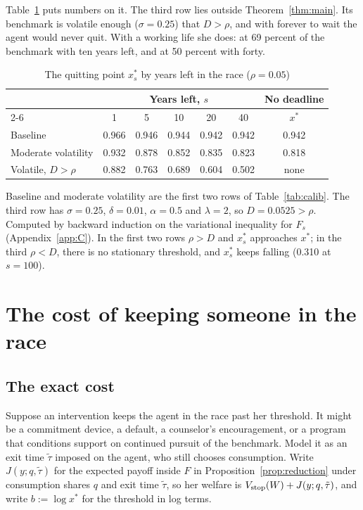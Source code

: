 \documentclass[12pt]{article}
\theoremstyle{definition}
\theoremstyle{remark}
\theoremstyle{plain}
\theoremstyle{definition}
\begin{document}
Table~\ref{tab:deadline} puts numbers on it. The third row lies outside Theorem~\ref{thm:main}. Its benchmark is volatile enough ($\sigma=0.25$) that $D>\rho$, and with forever to wait the agent would never quit. With a working life she does: at 69 percent of the benchmark with ten years left, and at 50 percent with forty.

\begin{table}[t]
\centering\small
\caption{The quitting point $x^*_s$ by years left in the race ($\rho=0.05$)}\label{tab:deadline}
\begin{tabular}{@{}lcccccc@{}}
\toprule
 & \multicolumn{5}{c}{Years left, $s$} & No deadline \\
\cmidrule(lr){2-6}
 & 1 & 5 & 10 & 20 & 40 & $x^*$ \\
\midrule
Baseline & 0.966 & 0.946 & 0.944 & 0.942 & 0.942 & 0.942 \\
Moderate volatility & 0.932 & 0.878 & 0.852 & 0.835 & 0.823 & 0.818 \\
Volatile, $D>\rho$ & 0.882 & 0.763 & 0.689 & 0.604 & 0.502 & none \\
\bottomrule
\end{tabular}
\par\smallskip\parbox{0.92\textwidth}{\footnotesize Baseline and moderate volatility are the first two rows of Table~\ref{tab:calib}. The third row has $\sigma=0.25$, $\delta=0.01$, $\alpha=0.5$ and $\lambda=2$, so $D=0.0525>\rho$. Computed by backward induction on the variational inequality for $F_s$ (Appendix~\ref{app:C}). In the first two rows $\rho>D$ and $x^*_s$ approaches $x^*$; in the third $\rho<D$, there is no stationary threshold, and $x^*_s$ keeps falling (0.310 at $s=100$).}
\end{table}

\section{The cost of keeping someone in the race}\label{sec:welfare}

\subsection{The exact cost}\label{sec:exact}

Suppose an intervention keeps the agent in the race past her threshold. It might be a commitment device, a default, a counselor's encouragement, or a program that conditions support on continued pursuit of the benchmark. Model it as an exit time $\tilde\tau$ imposed on the agent, who still chooses consumption. Write $J(y;q,\tilde\tau)$ for the expected payoff inside $F$ in Proposition~\ref{prop:reduction} under consumption shares $q$ and exit time $\tilde\tau$, so her welfare is $V_{\rm stop}(W)+J(y;q,\tilde\tau)$, and write $b:=\log x^*$ for the threshold in log terms.
\end{document}
